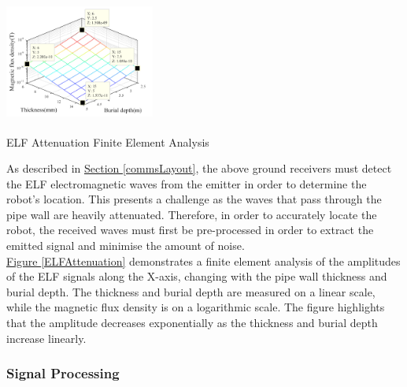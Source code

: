 \documentclass[11pt]{article}		%
\newcommand{\supercite}[1]{\textsuperscript{\cite{#1}}}		%
\newcommand{\figref}[1]{\hyperref[#1]{Figure \ref*{#1}}}    %
\newcommand{\sectref}[1]{\hyperref[#1]{Section \ref*{#1}}}     %
\begin{document}
		    \begin{floatingfigure}[r]{0.4\textwidth}
				\centering
				\includegraphics[width = 0.37\textwidth]{Attenuation}
				\caption{ELF Attenuation Finite Element Analysis \supercite{FDT}}
				\label{ELFAttenuation}
			\end{floatingfigure}
            \hspace*{3ex}As described in \sectref{commsLayout}, the above ground receivers must detect the ELF electromagnetic waves from the emitter in order to determine the robot's location.
			This presents a challenge as the waves that pass through the pipe wall are heavily attenuated. 
			Therefore, in order to accurately locate the robot, the received waves must first be pre-processed in order to extract the emitted signal and minimise the amount of noise.
			\\	    
		    \hspace*{3ex}\figref{ELFAttenuation} demonstrates a finite element analysis of the amplitudes of the ELF signals along the X-axis, changing with the pipe wall thickness and burial depth.
		    The thickness and burial depth are measured on a linear scale, while the magnetic flux density is on a logarithmic scale.
		    The figure highlights that the amplitude decreases exponentially as the thickness and burial depth increase linearly.

			\subsubsection{Signal Processing}
			
		    \begin{floatingfigure}[r]{0pt} \end{floatingfigure}
		    
\end{document}
